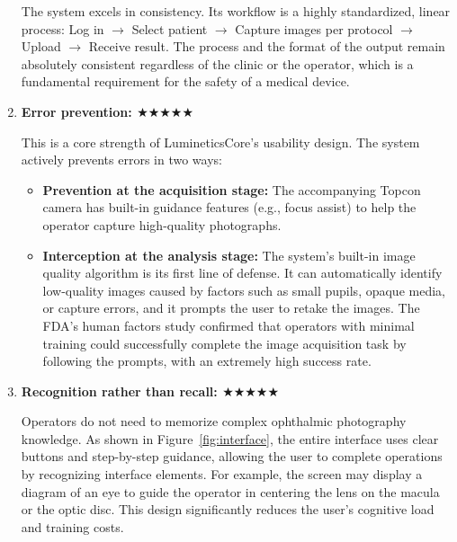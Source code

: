 \documentclass[sigplan,screen]{acmart}
\begin{document}
\begin{enumerate}
The system excels in consistency. Its workflow is a highly standardized, linear process: Log in $\rightarrow$ Select patient $\rightarrow$ Capture images per protocol $\rightarrow$ Upload $\rightarrow$ Receive result. The process and the format of the output remain absolutely consistent regardless of the clinic or the operator, which is a fundamental requirement for the safety of a medical device.

\item \textbf{Error prevention: $\bigstar\bigstar\bigstar\bigstar\bigstar$}

This is a core strength of LumineticsCore's usability design. The system actively prevents errors in two ways:
\begin{itemize}
\item \textbf{Prevention at the acquisition stage:} The accompanying Topcon camera has built-in guidance features (e.g., focus assist) to help the operator capture high-quality photographs.
\item \textbf{Interception at the analysis stage:} The system's built-in image quality algorithm is its first line of defense. It can automatically identify low-quality images caused by factors such as small pupils, opaque media, or capture errors, and it prompts the user to retake the images. The FDA's human factors study confirmed that operators with minimal training could successfully complete the image acquisition task by following the prompts, with an extremely high success rate.
\end{itemize}

\item \textbf{Recognition rather than recall: $\bigstar\bigstar\bigstar\bigstar\bigstar$}

Operators do not need to memorize complex ophthalmic photography knowledge. As shown in Figure~\ref{fig:interface}, the entire interface uses clear buttons and step-by-step guidance, allowing the user to complete operations by recognizing interface elements. For example, the screen may display a diagram of an eye to guide the operator in centering the lens on the macula or the optic disc. This design significantly reduces the user's cognitive load and training costs.


\end{enumerate}
\end{document}
